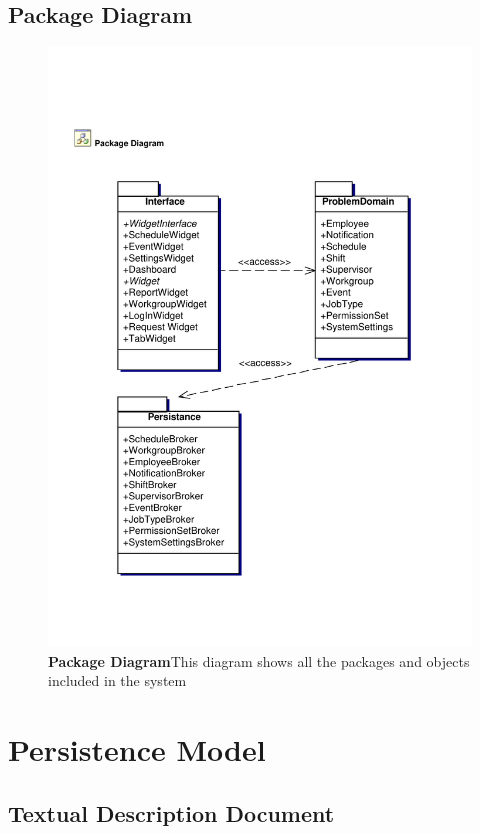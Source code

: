 \documentclass[letterpaper,12pt]{report}
\begin{document}
\section{Package Diagram}
\pagebreak
\begin{figure}[packageDiagram]
 \centering
 \includegraphics[scale=0.8,trim=10mm 30mm 25mm 25mm]{externals/PackageDiagram.pdf}
 \caption{\small
\textbf{Package Diagram}\newline This diagram shows all the packages and objects included in the system }\label{fig:packageDiagram}
\end{figure}

\chapter{Persistence Model}
\section{Textual Description Document}
\end{document}
